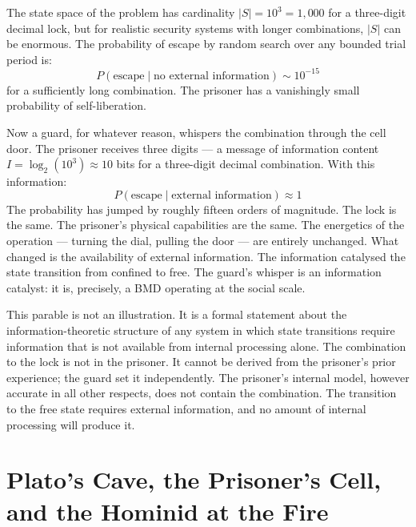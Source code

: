The state space of the problem has cardinality $|S| = 10^3 = 1{,}000$ for a three-digit decimal lock, but for realistic security systems with longer combinations, $|S|$ can be enormous. The probability of escape by random search over any bounded trial period is:
%
\begin{equation}
P(\mathrm{escape} \mid \text{no external information}) \sim 10^{-15}
\end{equation}
%
for a sufficiently long combination. The prisoner has a vanishingly small probability of self-liberation.

Now a guard, for whatever reason, whispers the combination through the cell door. The prisoner receives three digits --- a message of information content $I = \log_2(10^3) \approx 10$ bits for a three-digit decimal combination. With this information:
%
\begin{equation}
P(\mathrm{escape} \mid \text{external information}) \approx 1
\end{equation}
%
The probability has jumped by roughly fifteen orders of magnitude. The lock is the same. The prisoner's physical capabilities are the same. The energetics of the operation --- turning the dial, pulling the door --- are entirely unchanged. What changed is the availability of external information. The information catalysed the state transition from confined to free. The guard's whisper is an information catalyst: it is, precisely, a BMD operating at the social scale.

This parable is not an illustration. It is a formal statement about the information-theoretic structure of any system in which state transitions require information that is not available from internal processing alone. The combination to the lock is not in the prisoner. It cannot be derived from the prisoner's prior experience; the guard set it independently. The prisoner's internal model, however accurate in all other respects, does not contain the combination. The transition to the free state requires external information, and no amount of internal processing will produce it.

\bigskip

\section{Plato's Cave, the Prisoner's Cell, and the Hominid at the Fire}

